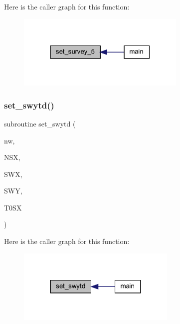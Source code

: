 Here is the caller graph for this function\+:\nopagebreak
\begin{figure}[H]
\begin{center}
\leavevmode
\includegraphics[width=229pt]{Leroi_8f90_a0fbc525b8664d780f1158e1061046731_icgraph}
\end{center}
\end{figure}
\mbox{\label{Leroi_8f90_a070fa81fa07083804479fa6b78707607}} 
\subsubsection{\texorpdfstring{set\+\_\+swytd()}{set\_swytd()}}
{\footnotesize\ttfamily subroutine set\+\_\+swytd (\begin{DoxyParamCaption}\item[{integer}]{nw,  }\item[{integer, intent(in)}]{N\+SX,  }\item[{real, dimension(nsx), intent(in)}]{S\+WX,  }\item[{real, dimension(nsx,3), intent(inout)}]{S\+WY,  }\item[{real}]{T0\+SX }\end{DoxyParamCaption})}

Here is the caller graph for this function\+:\nopagebreak
\begin{figure}[H]
\begin{center}
\leavevmode
\includegraphics[width=215pt]{Leroi_8f90_a070fa81fa07083804479fa6b78707607_icgraph}
\end{center}
\end{figure}
\mbox{\label{Leroi_8f90_ab7ca289c09589698d4ff1bd15e1a16e6}} 
